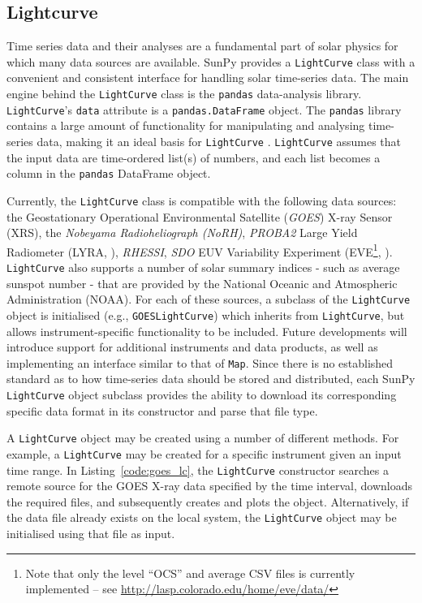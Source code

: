 \subsection{Lightcurve}\label{ssec:lightcurve}

Time series data and their analyses are a fundamental part of solar
physics for which many data sources are available.
SunPy provides a \texttt{LightCurve} class
with a convenient and consistent interface for handling solar time-series
data.  The main engine behind the \texttt{LightCurve} class is
the {\texttt{pandas}} data-analysis library.  
\texttt{LightCurve}'s \texttt{data} attribute is a \texttt{pandas.DataFrame} 
object. The \texttt{pandas} library contains a large amount
of functionality for manipulating and analysing time-series data,
making it an ideal basis for \texttt{LightCurve} \citep{mckinney2012}.  \texttt{LightCurve}
assumes that the input data are time-ordered list(s) of numbers, and each
list becomes a column in the \texttt{pandas} DataFrame object.

Currently, the \texttt{LightCurve} class is compatible with the
following data sources: the Geostationary Operational Environmental
Satellite (\textit{GOES}) X-ray Sensor (XRS), the \textit{Nobeyama
  Radioheliograph (NoRH)}, \textit{PROBA2} Large Yield Radiometer
(LYRA, \cite{2013SoPh..286...21D}), \textit{RHESSI},
\textit{SDO} EUV Variability Experiment (EVE\footnote{Note that only the level ``OCS'' and average
  CSV files is currently implemented -- see
  \url{http://lasp.colorado.edu/home/eve/data/}}, \citep{2012SoPh..275..115W}). \texttt{LightCurve}
also supports a number of solar summary indices - such as average
sunspot number - that are provided by the National Oceanic and
Atmospheric Administration (NOAA).  For each of these sources, a
subclass of the \texttt{LightCurve} object is initialised (e.g.,
\texttt{GOESLightCurve}) which inherits from \texttt{LightCurve}, but
allows instrument-specific functionality to be included.  Future
developments will introduce support for additional instruments and
data products, as well as implementing an interface similar to that of
\texttt{Map}.  Since there is no established standard as to how
time-series data should be stored and distributed, each SunPy
\texttt{LightCurve} object subclass provides the ability to download
its corresponding specific data format in its constructor and parse
that file type.

A \texttt{LightCurve} object may be created using a number of different methods. 
For example, a \texttt{LightCurve} may be created for a specific instrument given
an input time range. In Listing~\ref{code:goes_lc}, 
the \texttt{LightCurve} constructor searches a remote source for the GOES X-ray 
data specified by the time interval, downloads the required files, and 
subsequently creates and plots the object. Alternatively, if the data file 
already exists on the local system, the \texttt{LightCurve} object may be 
initialised using that file as input.

